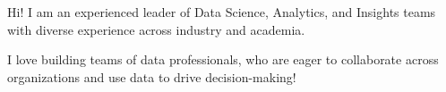 \begin {cvsummary}

Hi! I am an experienced leader of Data Science, Analytics, and Insights teams with diverse experience across industry and academia.

I love building teams of data professionals, who are eager to collaborate across organizations and use data to drive decision-making!

\vspace{1mm}
\end {cvsummary}
